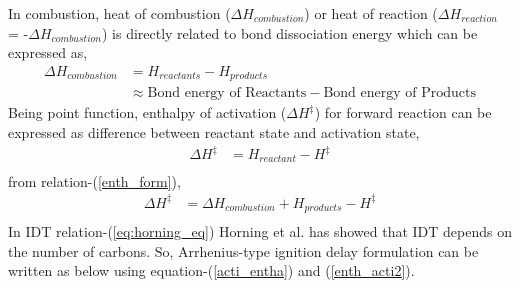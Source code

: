 \documentclass[preprint,12pt]{elsarticle}
\begin{document}
		 In combustion, heat of combustion  ($\Delta H_{combustion}$) or heat of reaction  ($\Delta H_{reaction}$ = -$\Delta H_{combustion}$) is directly related to bond dissociation energy \cite{bond_energy} which can be expressed as,
		\begin{equation}\label{enth_form}
		\begin{aligned}
		\Delta H_{combustion} &= H_{reactants} - H_{products} \\
		&\approx \text{Bond energy of Reactants}- \text{Bond energy of Products}
		\end{aligned}
		\end{equation}
		Being point function, enthalpy of activation ($\Delta H^\ddagger$) for forward reaction can be expressed as difference between reactant state and activation state,
		\begin{equation}\label{enth_acti1}
		\begin{aligned}
		\Delta H^{\ddagger} &= H_{reactant} - H^{\ddagger} \\
		\end{aligned}
		\end{equation}
		from relation-(\ref{enth_form}),
		\begin{equation}\label{enth_acti2}
		\begin{aligned}
		\Delta H^{\ddagger} &=\Delta H_{combustion} + H_{products} - H^{\ddagger} \\
		\end{aligned}
		\end{equation}
		In IDT relation-(\ref{eq:horning_eq}) Horning et al. has showed that IDT depends on the number of carbons. So, Arrhenius-type ignition delay formulation can be written as below using equation-(\ref{acti_entha}) and (\ref{enth_acti2}). 
\end{document}
